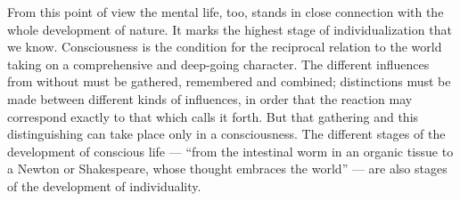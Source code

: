 \documentclass[12pt,a4paper,openany]{book}
\begin{document}
From this point of view the mental life, too, stands in close connection with
the whole development of nature. It marks the highest stage of
individualization that we know. Consciousness is the condition for the
reciprocal relation to the world taking on a comprehensive and deep-going
character. The different influences from without must be gathered, remembered
and combined; distinctions must be made between different kinds of influences,
in order that the reaction may correspond exactly to that which calls it
forth. But that gathering and this distinguishing can take place only in a
consciousness. The different stages of the development of conscious life ---
``from the intestinal worm in an organic tissue to a Newton or Shakespeare,
whose thought embraces the world'' --- are also stages of the development of
individuality.
\end{document}

